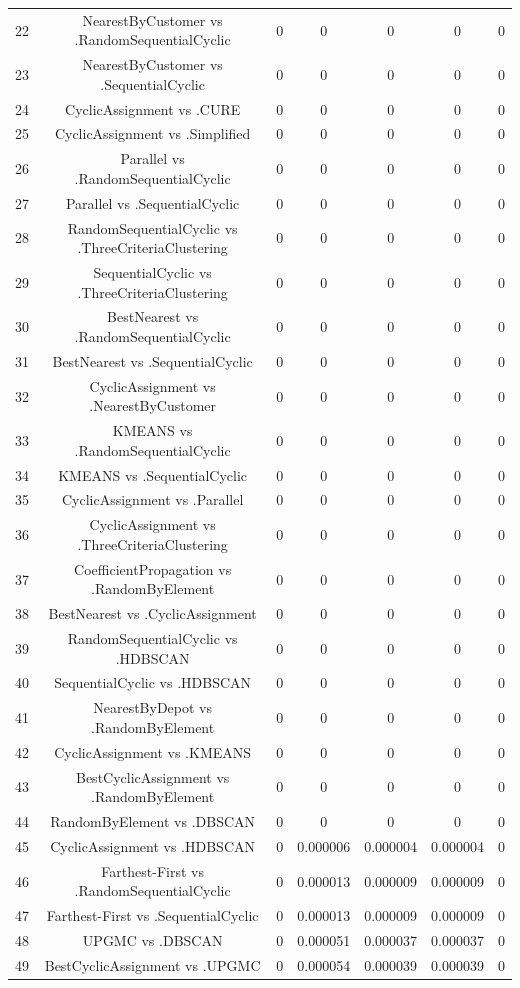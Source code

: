 \documentclass[a4paper,10pt]{article}
\begin{document}
\begin{landscape}
\begin{table}[!htp]
\begin{tabular}{ccccccc}
22&NearestByCustomer vs .RandomSequentialCyclic&0&0&0&0&0\\
23&NearestByCustomer vs .SequentialCyclic&0&0&0&0&0\\
24&CyclicAssignment vs .CURE&0&0&0&0&0\\
25&CyclicAssignment vs .Simplified&0&0&0&0&0\\
26&Parallel vs .RandomSequentialCyclic&0&0&0&0&0\\
27&Parallel vs .SequentialCyclic&0&0&0&0&0\\
28&RandomSequentialCyclic vs .ThreeCriteriaClustering&0&0&0&0&0\\
29&SequentialCyclic vs .ThreeCriteriaClustering&0&0&0&0&0\\
30&BestNearest vs .RandomSequentialCyclic&0&0&0&0&0\\
31&BestNearest vs .SequentialCyclic&0&0&0&0&0\\
32&CyclicAssignment vs .NearestByCustomer&0&0&0&0&0\\
33&KMEANS vs .RandomSequentialCyclic&0&0&0&0&0\\
34&KMEANS vs .SequentialCyclic&0&0&0&0&0\\
35&CyclicAssignment vs .Parallel&0&0&0&0&0\\
36&CyclicAssignment vs .ThreeCriteriaClustering&0&0&0&0&0\\
37&CoefficientPropagation vs .RandomByElement&0&0&0&0&0\\
38&BestNearest vs .CyclicAssignment&0&0&0&0&0\\
39&RandomSequentialCyclic vs .HDBSCAN&0&0&0&0&0\\
40&SequentialCyclic vs .HDBSCAN&0&0&0&0&0\\
41&NearestByDepot vs .RandomByElement&0&0&0&0&0\\
42&CyclicAssignment vs .KMEANS&0&0&0&0&0\\
43&BestCyclicAssignment vs .RandomByElement&0&0&0&0&0\\
44&RandomByElement vs .DBSCAN&0&0&0&0&0\\
45&CyclicAssignment vs .HDBSCAN&0&0.000006&0.000004&0.000004&0\\
46&Farthest-First vs .RandomSequentialCyclic&0&0.000013&0.000009&0.000009&0\\
47&Farthest-First vs .SequentialCyclic&0&0.000013&0.000009&0.000009&0\\
48&UPGMC vs .DBSCAN&0&0.000051&0.000037&0.000037&0\\
49&BestCyclicAssignment vs .UPGMC&0&0.000054&0.000039&0.000039&0\\

\end{tabular}
\end{table}
\end{landscape}
\end{document}
